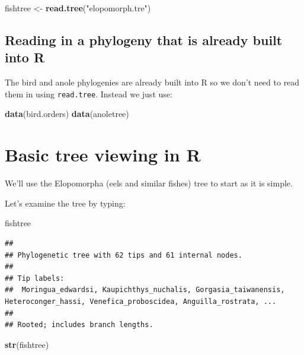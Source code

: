 \documentclass[]{book}
\newenvironment{Shaded}{\begin{snugshade}}{\end{snugshade}}
\newcommand{\KeywordTok}[1]{\textcolor[rgb]{0.13,0.29,0.53}{\textbf{{#1}}}}
\newcommand{\StringTok}[1]{\textcolor[rgb]{0.31,0.60,0.02}{{#1}}}
\newcommand{\NormalTok}[1]{{#1}}
\begin{document}
\begin{Shaded}
\begin{Highlighting}[]
\NormalTok{fishtree <-}\StringTok{ }\KeywordTok{read.tree}\NormalTok{(}\StringTok{"elopomorph.tre"}\NormalTok{)}
\end{Highlighting}
\end{Shaded}

\subsection{Reading in a phylogeny that is already built into
R}\label{reading-in-a-phylogeny-that-is-already-built-into-r}

The bird and anole phylogenies are already built into R so we don't need
to read them in using \texttt{read.tree}. Instead we just use:

\begin{Shaded}
\begin{Highlighting}[]
\KeywordTok{data}\NormalTok{(bird.orders)}
\KeywordTok{data}\NormalTok{(anoletree)}
\end{Highlighting}
\end{Shaded}

\section{Basic tree viewing in R}\label{basic-tree-viewing-in-r}

We'll use the Elopomorpha (eels and similar fishes) tree to start as it
is simple.

Let's examine the tree by typing:

\begin{Shaded}
\begin{Highlighting}[]
\NormalTok{fishtree}
\end{Highlighting}
\end{Shaded}

\begin{verbatim}
## 
## Phylogenetic tree with 62 tips and 61 internal nodes.
## 
## Tip labels:
##  Moringua_edwardsi, Kaupichthys_nuchalis, Gorgasia_taiwanensis, Heteroconger_hassi, Venefica_proboscidea, Anguilla_rostrata, ...
## 
## Rooted; includes branch lengths.
\end{verbatim}

\begin{Shaded}
\begin{Highlighting}[]
\KeywordTok{str}\NormalTok{(fishtree)}
\end{Highlighting}
\end{Shaded}
\end{document}
